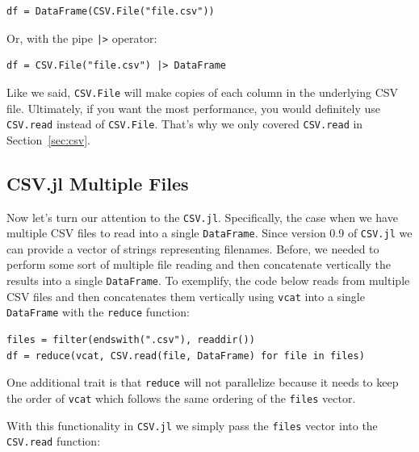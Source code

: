 \documentclass[
  notoc %
]{tufte-book}
\newcommand{\passthrough}[1]{#1}
\begin{document}
\begin{lstlisting}
df = DataFrame(CSV.File("file.csv"))
\end{lstlisting}

Or, with the pipe \passthrough{\lstinline!|>!} operator:

\begin{lstlisting}
df = CSV.File("file.csv") |> DataFrame
\end{lstlisting}

Like we said, \passthrough{\lstinline!CSV.File!} will make copies of
each column in the underlying CSV file. Ultimately, if you want the most
performance, you would definitely use \passthrough{\lstinline!CSV.read!}
instead of \passthrough{\lstinline!CSV.File!}. That's why we only
covered \passthrough{\lstinline!CSV.read!} in Section~\ref{sec:csv}.

\hypertarget{sec:df_performance_csv_multiple}{%
\subsection{CSV.jl Multiple
Files}\label{sec:df_performance_csv_multiple}}

Now let's turn our attention to the \passthrough{\lstinline!CSV.jl!}.
Specifically, the case when we have multiple CSV files to read into a
single \passthrough{\lstinline!DataFrame!}. Since version 0.9 of
\passthrough{\lstinline!CSV.jl!} we can provide a vector of strings
representing filenames. Before, we needed to perform some sort of
multiple file reading and then concatenate vertically the results into a
single \passthrough{\lstinline!DataFrame!}. To exemplify, the code below
reads from multiple CSV files and then concatenates them vertically
using \passthrough{\lstinline!vcat!} into a single
\passthrough{\lstinline!DataFrame!} with the
\passthrough{\lstinline!reduce!} function:

\begin{lstlisting}
files = filter(endswith(".csv"), readdir())
df = reduce(vcat, CSV.read(file, DataFrame) for file in files)
\end{lstlisting}

One additional trait is that \passthrough{\lstinline!reduce!} will not
parallelize because it needs to keep the order of
\passthrough{\lstinline!vcat!} which follows the same ordering of the
\passthrough{\lstinline!files!} vector.

With this functionality in \passthrough{\lstinline!CSV.jl!} we simply
pass the \passthrough{\lstinline!files!} vector into the
\passthrough{\lstinline!CSV.read!} function:
\end{document}
